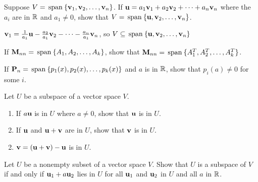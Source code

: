 \begin{multicols}{2}
\begin{ex}
\begin{sol}
\begin{enumerate}[label={\alph*.}]
\end{enumerate}
\end{sol}
\end{ex}

\begin{ex}
Suppose $V = \thinspace\operatorname{span\medspace}\{\textbf{v}_{1}, \textbf{v}_{2}, \dots, \textbf{v}_{n}\}$. If $\textbf{u} = a_{1}\textbf{v}_{1} + a_{2}\textbf{v}_{2} + \dots+ a_{n}\textbf{v}_{n}$ where the $a_{i}$ are in $\mathbb{R}$ and $a_{1} \neq 0$, show that $V = \thinspace\operatorname{span\medspace}\{\textbf{u}, \textbf{v}_{2}, \dots, \textbf{v}_{n}\}$.

\begin{sol}
$\textbf{v}_1 = \tfrac{1}{a_1}\textbf{u} - \tfrac{a_2}{a_1}\textbf{v}_2 - \dots - \tfrac{a_n}{a_1}\textbf{v}_n$, so $V \subseteq \thinspace\operatorname{span\medspace}\{\textbf{u}, \textbf{v}_2, \dots, \textbf{v}_n \}$
\end{sol}
\end{ex}

\begin{ex}
If $\textbf{M}_{nn} = \thinspace\operatorname{span\medspace}\{A_1, A_2, \dots, A_k\}$, show that $\textbf{M}_{nn} = \thinspace\operatorname{span\medspace}\{A_1^T, A_2^T, \dots, A_k^T\}$.
\end{ex}

\begin{ex}
If $\textbf{P}_{n} = \thinspace\operatorname{span\medspace}\{p_{1}(x), p_{2}(x), \dots, p_{k}(x)\}$ and $a$ is in $\mathbb{R}$, show that $p_{i}(a) \neq 0$ for some $i$.
\end{ex}

\begin{ex}
Let $U$ be a subspace of a vector space $V$.

\begin{enumerate}[label={\alph*.}]
\item If $a\textbf{u}$ is in $U$ where $a \neq 0$, show that $\textbf{u}$ is in $U$.

\item If $\textbf{u}$ and $\textbf{u} + \textbf{v}$ are in $U$, show that $\textbf{v}$ is in $U$.

\end{enumerate}
\begin{sol}
\begin{enumerate}[label={\alph*.}]
\setcounter{enumi}{1}
\item  $\textbf{v} = (\textbf{u} + \textbf{v}) - \textbf{u}$ is in $U$.

\end{enumerate}
\end{sol}
\end{ex}

\begin{ex}
Let $U$ be a nonempty subset of a vector space $V$. Show that $U$ is a subspace of $V$ if and only if $\textbf{u}_{1} + a\textbf{u}_{2}$ lies in $U$ for all $\textbf{u}_{1}$ and $\textbf{u}_{2}$ in $U$ and all $a$ in $\mathbb{R}$.


\end{ex}
\end{multicols}
